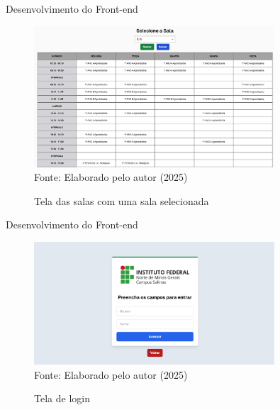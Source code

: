\begin{frame}{Desenvolvimento do Front-end}
    \begin{figure}
        \centering
        \vspace{-0.5cm}
        \caption{Tela das salas com uma sala selecionada}
        \vspace{-0.2cm}
        \includegraphics[width=0.8\textwidth]{figuras/front-8.png}
        \\ %
        \small Fonte: Elaborado pelo autor (2025)
    \end{figure}
\end{frame}

\begin{frame}{Desenvolvimento do Front-end}
    \begin{figure}
        \centering
        \vspace{-0.5cm}
        \caption{Tela de login}
        \vspace{-0.2cm}
        \includegraphics[width=0.8\textwidth]{figuras/front-9.png}
        \\ %
        \small Fonte: Elaborado pelo autor (2025)
    \end{figure}
\end{frame}

